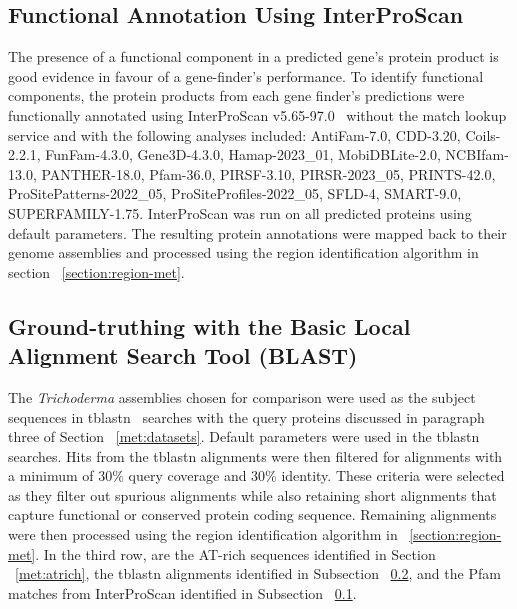 \subsection{Functional Annotation Using InterProScan}
\label{met:interproscan}
The presence of a functional component in a predicted gene's protein
product is good evidence in favour of a gene-finder's performance. To
identify functional components, the protein products from each gene
finder's predictions were functionally annotated using InterProScan
v5.65-97.0~\cite{jones2014} without the match
lookup service and with the following analyses included: AntiFam-7.0,
CDD-3.20, Coils-2.2.1, FunFam-4.3.0, Gene3D-4.3.0, Hamap-2023\_01,
MobiDBLite-2.0, NCBIfam-13.0, PANTHER-18.0, Pfam-36.0, PIRSF-3.10,
PIRSR-2023\_05, PRINTS-42.0, ProSitePatterns-2022\_05,
ProSiteProfiles-2022\_05, SFLD-4, SMART-9.0,
SUPERFAMILY-1.75. InterProScan was run on all predicted proteins using
default parameters. The resulting protein annotations were mapped back
to their genome assemblies and processed using the region
identification algorithm in section ~\ref{section:region-met}.

\subsection{Ground-truthing with the Basic Local Alignment Search Tool (BLAST)}
\label{met:blast}
The \textit{Trichoderma} assemblies chosen for comparison were used as
the subject sequences in tblastn~\cite{gertz2006} searches with the query proteins discussed in paragraph three of Section ~\ref{met:datasets}. Default parameters were used in the tblastn searches. Hits from the tblastn alignments were then filtered for alignments with a minimum of 30\% query coverage and 30\% identity. These criteria were selected as they filter out spurious alignments while also retaining short alignments that capture functional or conserved protein coding sequence. Remaining alignments were then processed using the region identification algorithm in ~\ref{section:region-met}. In the third row, are the AT-rich sequences identified in Section ~\ref{met:atrich}, the tblastn alignments identified in Subsection ~\ref{met:blast}, and the Pfam matches from InterProScan identified in Subsection ~\ref{met:interproscan}.

